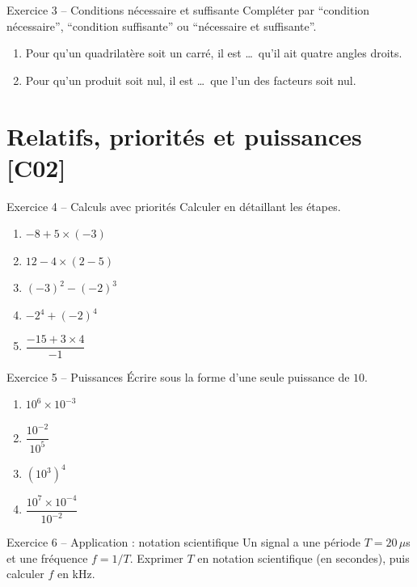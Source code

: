 \documentclass[a4paper,11pt]{article}
\begin{document}
\begin{exo}{Exercice 3 -- Conditions nécessaire et suffisante}
Compléter par ``condition nécessaire'', ``condition suffisante'' ou ``nécessaire et suffisante''.
\begin{enumerate}[label=\alph*)]
  \item Pour qu'un quadrilatère soit un carré, il est \dots\ qu'il ait quatre angles droits.
  \item Pour qu'un produit soit nul, il est \dots\ que l'un des facteurs soit nul.
\end{enumerate}
\end{exo}

\section{Relatifs, priorités et puissances \hfill {\normalsize\color{uimmred}[C02]}}

\begin{exo}{Exercice 4 -- Calculs avec priorités}
Calculer en détaillant les étapes.
\begin{enumerate}[label=\alph*)]
  \item $-8 + 5 \times (-3)$
  \item $12 - 4 \times (2 - 5)$
  \item $(-3)^2 - (-2)^3$
  \item $-2^4 + (-2)^4$
  \item $\dfrac{-15 + 3 \times 4}{-1}$
\end{enumerate}
\end{exo}

\begin{exo}{Exercice 5 -- Puissances}
Écrire sous la forme d'une seule puissance de $10$.
\begin{enumerate}[label=\alph*)]
  \item $10^6 \times 10^{-3}$
  \item $\dfrac{10^{-2}}{10^{5}}$
  \item $\left(10^{3}\right)^{4}$
  \item $\dfrac{10^7 \times 10^{-4}}{10^{-2}}$
\end{enumerate}
\end{exo}

\begin{exo}{Exercice 6 -- Application : notation scientifique}
Un signal a une période $T = 20\,\mu$s et une fréquence $f = 1/T$. Exprimer $T$ en notation scientifique (en secondes), puis calculer $f$ en kHz.
\end{exo}
\end{document}
